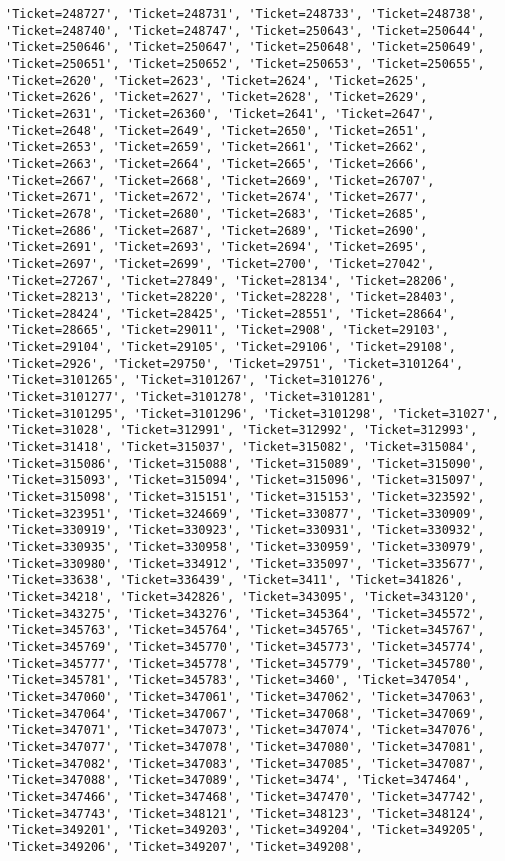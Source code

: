 \documentclass[11pt]{article}
\begin{document}
\begin{Verbatim}[commandchars=\\\{\}]
'Ticket=248727', 'Ticket=248731', 'Ticket=248733', 'Ticket=248738', 'Ticket=248740', 'Ticket=248747', 'Ticket=250643', 'Ticket=250644', 'Ticket=250646', 'Ticket=250647', 'Ticket=250648', 'Ticket=250649', 'Ticket=250651', 'Ticket=250652', 'Ticket=250653', 'Ticket=250655', 'Ticket=2620', 'Ticket=2623', 'Ticket=2624', 'Ticket=2625', 'Ticket=2626', 'Ticket=2627', 'Ticket=2628', 'Ticket=2629', 'Ticket=2631', 'Ticket=26360', 'Ticket=2641', 'Ticket=2647', 'Ticket=2648', 'Ticket=2649', 'Ticket=2650', 'Ticket=2651', 'Ticket=2653', 'Ticket=2659', 'Ticket=2661', 'Ticket=2662', 'Ticket=2663', 'Ticket=2664', 'Ticket=2665', 'Ticket=2666', 'Ticket=2667', 'Ticket=2668', 'Ticket=2669', 'Ticket=26707', 'Ticket=2671', 'Ticket=2672', 'Ticket=2674', 'Ticket=2677', 'Ticket=2678', 'Ticket=2680', 'Ticket=2683', 'Ticket=2685', 'Ticket=2686', 'Ticket=2687', 'Ticket=2689', 'Ticket=2690', 'Ticket=2691', 'Ticket=2693', 'Ticket=2694', 'Ticket=2695', 'Ticket=2697', 'Ticket=2699', 'Ticket=2700', 'Ticket=27042', 'Ticket=27267', 'Ticket=27849', 'Ticket=28134', 'Ticket=28206', 'Ticket=28213', 'Ticket=28220', 'Ticket=28228', 'Ticket=28403', 'Ticket=28424', 'Ticket=28425', 'Ticket=28551', 'Ticket=28664', 'Ticket=28665', 'Ticket=29011', 'Ticket=2908', 'Ticket=29103', 'Ticket=29104', 'Ticket=29105', 'Ticket=29106', 'Ticket=29108', 'Ticket=2926', 'Ticket=29750', 'Ticket=29751', 'Ticket=3101264', 'Ticket=3101265', 'Ticket=3101267', 'Ticket=3101276', 'Ticket=3101277', 'Ticket=3101278', 'Ticket=3101281', 'Ticket=3101295', 'Ticket=3101296', 'Ticket=3101298', 'Ticket=31027', 'Ticket=31028', 'Ticket=312991', 'Ticket=312992', 'Ticket=312993', 'Ticket=31418', 'Ticket=315037', 'Ticket=315082', 'Ticket=315084', 'Ticket=315086', 'Ticket=315088', 'Ticket=315089', 'Ticket=315090', 'Ticket=315093', 'Ticket=315094', 'Ticket=315096', 'Ticket=315097', 'Ticket=315098', 'Ticket=315151', 'Ticket=315153', 'Ticket=323592', 'Ticket=323951', 'Ticket=324669', 'Ticket=330877', 'Ticket=330909', 'Ticket=330919', 'Ticket=330923', 'Ticket=330931', 'Ticket=330932', 'Ticket=330935', 'Ticket=330958', 'Ticket=330959', 'Ticket=330979', 'Ticket=330980', 'Ticket=334912', 'Ticket=335097', 'Ticket=335677', 'Ticket=33638', 'Ticket=336439', 'Ticket=3411', 'Ticket=341826', 'Ticket=34218', 'Ticket=342826', 'Ticket=343095', 'Ticket=343120', 'Ticket=343275', 'Ticket=343276', 'Ticket=345364', 'Ticket=345572', 'Ticket=345763', 'Ticket=345764', 'Ticket=345765', 'Ticket=345767', 'Ticket=345769', 'Ticket=345770', 'Ticket=345773', 'Ticket=345774', 'Ticket=345777', 'Ticket=345778', 'Ticket=345779', 'Ticket=345780', 'Ticket=345781', 'Ticket=345783', 'Ticket=3460', 'Ticket=347054', 'Ticket=347060', 'Ticket=347061', 'Ticket=347062', 'Ticket=347063', 'Ticket=347064', 'Ticket=347067', 'Ticket=347068', 'Ticket=347069', 'Ticket=347071', 'Ticket=347073', 'Ticket=347074', 'Ticket=347076', 'Ticket=347077', 'Ticket=347078', 'Ticket=347080', 'Ticket=347081', 'Ticket=347082', 'Ticket=347083', 'Ticket=347085', 'Ticket=347087', 'Ticket=347088', 'Ticket=347089', 'Ticket=3474', 'Ticket=347464', 'Ticket=347466', 'Ticket=347468', 'Ticket=347470', 'Ticket=347742', 'Ticket=347743', 'Ticket=348121', 'Ticket=348123', 'Ticket=348124', 'Ticket=349201', 'Ticket=349203', 'Ticket=349204', 'Ticket=349205', 'Ticket=349206', 'Ticket=349207', 'Ticket=349208', 
\end{Verbatim}
\end{document}
